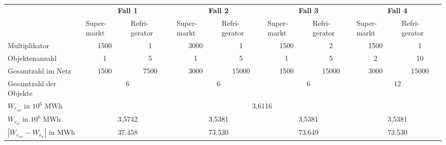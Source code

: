 \begin{table}
\footnotesize{
\centering
\begin{tabularx}{\textwidth}{X|X|X|X|X|X|X|X|X|}
\cline{2-9}
& \multicolumn{2}{c|}{\textbf{Fall 1}} & \multicolumn{2}{c|}{\textbf{Fall 2}}
&  \multicolumn{2}{c|}{\textbf{Fall 3}} &  \multicolumn{2}{c|}{\textbf{Fall 4}}\\
 \cline{2-9}
& Super- \linebreak markt & Refri- \linebreak gerator & Super- \linebreak markt
& Refri- \linebreak gerator & Super- \linebreak markt & Refri-\linebreak gerator
& Super- \linebreak markt & Refri-\linebreak gerator \\
\hline
\multicolumn{1}{|l|}{Multiplikator} & \multicolumn{1}{c|}{1500} &
\multicolumn{1}{c|}{1} & \multicolumn{1}{c|}{3000} & \multicolumn{1}{c|}{1} &
\multicolumn{1}{c|}{1500} & \multicolumn{1}{c|}{2} & \multicolumn{1}{c|}{1500} &
\multicolumn{1}{c|}{1} \\
\hline
\multicolumn{1}{|l|}{Objektenanzahl} & \multicolumn{1}{c|}{1} &
\multicolumn{1}{c|}{5}& \multicolumn{1}{c|}{1} & \multicolumn{1}{c|}{5} &
\multicolumn{1}{c|}{1}& \multicolumn{1}{c|}{5} & \multicolumn{1}{c|}{2}&
\multicolumn{1}{c|}{10} \\
\hline
\multicolumn{1}{|l|}{Gesamtzahl im Netz} & \multicolumn{1}{c|}{1500} &
\multicolumn{1}{c|}{7500}& \multicolumn{1}{c|}{3000} & \multicolumn{1}{c|}{15000} &
\multicolumn{1}{c|}{1500} & \multicolumn{1}{c|}{15000} & \multicolumn{1}{c|}{3000}&
\multicolumn{1}{c|}{15000} \\
\hline
\multicolumn{1}{|l|}{Gesamtzahl der Objekte} & \multicolumn{2}{c|}{6} &
\multicolumn{2}{c|}{6} & \multicolumn{2}{c|}{6} & \multicolumn{2}{c|}{12}\\
\hline
\hline
\multicolumn{1}{|l|}{$W_{r_{wo}}$ in $10^6$ MWh } & \multicolumn{8}{c|}{3,6116}\\
\hline
\multicolumn{1}{|l|}{$W_{r_{w}}$ in $10^6$ MWh} & \multicolumn{2}{c|}{3,5742} &
\multicolumn{2}{c|}{3,5381} &
\multicolumn{2}{c|}{3,5381} &
\multicolumn{2}{c|}{3,5381}\\
\hline
\multicolumn{1}{|l|}{$|W_{r_{wo}} - W_{r_{w}}|$ in MWh} &
\multicolumn{2}{c|}{37.458} &
\multicolumn{2}{c|}{73.530} &
\multicolumn{2}{c|}{73.649} &
\multicolumn{2}{c|}{73.530}\\

\end{tabularx}}
\end{table}
